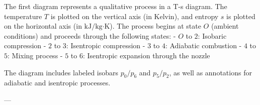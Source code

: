The first diagram represents a qualitative process in a T-s diagram. The temperature \( T \) is plotted on the vertical axis (in Kelvin), and entropy \( s \) is plotted on the horizontal axis (in \( \text{kJ}/\text{kg·K} \)). The process begins at state \( O \) (ambient conditions) and proceeds through the following states:  
- \( O \) to \( 2 \): Isobaric compression  
- \( 2 \) to \( 3 \): Isentropic compression  
- \( 3 \) to \( 4 \): Adiabatic combustion  
- \( 4 \) to \( 5 \): Mixing process  
- \( 5 \) to \( 6 \): Isentropic expansion through the nozzle  

The diagram includes labeled isobars \( p_0/p_6 \) and \( p_5/p_2 \), as well as annotations for adiabatic and isentropic processes.  

---